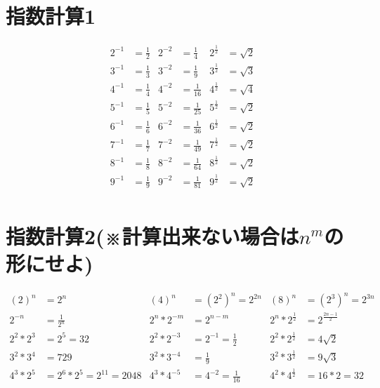 \documentclass[paper=b4j,landscape,twocolumn,fleqn]{jlreq}
\begin{document}
\newpage
\section{指数計算1}
\begin{align*}
  2^{-1}&=\frac{1}{2} & 2^{-2}&=\frac{1}{4} & 2^{\frac{1}{2}}&=\sqrt{2}\\
  3^{-1}&=\frac{1}{3} & 3^{-2}&=\frac{1}{9} & 3^{\frac{1}{2}}&=\sqrt{3}\\
  4^{-1}&=\frac{1}{4} & 4^{-2}&=\frac{1}{16} & 4^{\frac{1}{2}}&=\sqrt{4}\\
  5^{-1}&=\frac{1}{5} & 5^{-2}&=\frac{1}{25} & 5^{\frac{1}{2}}&=\sqrt{2}\\
  6^{-1}&=\frac{1}{6} & 6^{-2}&=\frac{1}{36} & 6^{\frac{1}{2}}&=\sqrt{2}\\
  7^{-1}&=\frac{1}{7} & 7^{-2}&=\frac{1}{49} & 7^{\frac{1}{2}}&=\sqrt{2}\\
  8^{-1}&=\frac{1}{8} & 8^{-2}&=\frac{1}{64} & 8^{\frac{1}{2}}&=\sqrt{2}\\
  9^{-1}&=\frac{1}{9} & 9^{-2}&=\frac{1}{81} & 9^{\frac{1}{2}}&=\sqrt{2}\\
\end{align*}
\section{指数計算2(※計算出来ない場合は$n^m$の形にせよ)}
\begin{align*}
  (2)^n&=2^n & (4)^n&=(2^2)^n=2^{2n} & (8)^n&=(2^3)^n=2^{3n}\\
  2^{-n}&=\frac{1}{2^n} & 2^n*2^{-m}&=2^{n-m} & 2^n * 2^{\frac{1}{2}}&=2^{\frac{2n-1}{2}}\\
  2^2*2^3&=2^5=32 & 2^2*2^{-3}&=2^{-1}=\frac{1}{2} & 2^2*2^{\frac{1}{2}}&=4\sqrt{2}\\
  3^2*3^4&=729 & 3^2*3^{-4}&=\frac{1}{9} & 3^2*3^{\frac{1}{2}}&=9\sqrt{3}\\
  4^3*2^5&=2^6*2^5=2^{11}=2048 & 4^3*4^{-5}&=4^{-2}=\frac{1}{16} & 4^2*4^{\frac{1}{2}}&=16*2=32\\
\end{align*}
\end{document}
